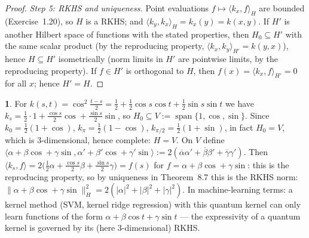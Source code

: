 \documentclass[11pt,a4paper]{article}
\numberwithin{equation}{section}
\newcommand{\ip}[2]{\langle #1, #2\rangle}
\newcommand{\conj}[1]{\overline{#1}}
\DeclareMathOperator{\spn}{span}
\theoremstyle{plain}
\theoremstyle{definition}
\newcommand{\thistheoremname}{}
\theoremstyle{plain}
\theoremstyle{definition}
\newtheorem*{addeddef*}{\thistheoremname}
\newenvironment{addeddef}[1]{\renewcommand{\thistheoremname}{#1}\begin{addeddef*}}{\end{addeddef*}}
\begin{document}
\begin{proof}
\emph{Step 5: RKHS and uniqueness.} Point evaluations $f\mapsto\ip{k_x}f_H$ are bounded
(Exercise~1.20), so $H$ is a RKHS; and $\ip{k_y}{k_x}_H=k_x(y)=k(x,y)$. If $H'$ is another Hilbert space of functions with the
stated properties, then $H_0\subseteq H'$ with the same scalar product (by the reproducing
property, $\ip{k_x}{k_y}_{H'}=k(y,x)$), hence $H\subseteq H'$ isometrically (norm limits in
$H'$ are pointwise limits, by the reproducing property). If $f\in H'$ is orthogonal to $H$,
then $f(x)=\ip{k_x}{f}_{H'}=0$ for all $x$; hence $H'=H$.
\end{proof}

\begin{addeddef}{Example 8.8 (the RKHS of the quantum kernel of Example~8.4)}
For $k(s,t)=\cos^2\frac{t-s}2=\frac12+\frac12\cos s\cos t+\frac12\sin s\sin t$ we have
$k_s=\frac12\cdot1+\frac{\cos s}2\cos+\frac{\sin s}2\sin$, so $H_0\subseteq V:=\spn\{1,\cos,\sin\}$.
Since $k_0=\frac12(1+\cos)$, $k_\pi=\frac12(1-\cos)$, $k_{\pi/2}=\frac12(1+\sin)$, in fact
$H_0=V$, which is $3$-dimensional, hence complete: $H=V$. On $V$ define
$\ip{\alpha+\beta\cos+\gamma\sin}{\alpha'+\beta'\cos+\gamma'\sin}
:=2(\conj\alpha\alpha'+\conj\beta\beta'+\conj\gamma\gamma')$. Then
$\ip{k_s}{f}=2\big(\frac12\alpha+\frac{\cos s}2\beta+\frac{\sin s}2\gamma\big)=f(s)$ for
$f=\alpha+\beta\cos+\gamma\sin$: this is the reproducing property, so by uniqueness in
Theorem~8.7 this is the RKHS norm: $\|\alpha+\beta\cos+\gamma\sin\|_H^2=2(|\alpha|^2+|\beta|^2+|\gamma|^2)$.
In machine-learning terms: a kernel method (SVM, kernel ridge regression) with this quantum
kernel can only learn functions of the form $\alpha+\beta\cos t+\gamma\sin t$ --- the
expressivity of a quantum kernel is governed by its (here 3-dimensional) RKHS.
\end{addeddef}
\end{document}
